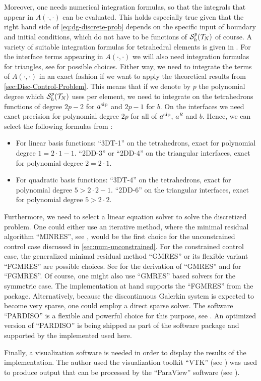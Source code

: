 \documentclass[../thesis.tex]{subfiles}
\begin{document}
Moreover, one needs numerical integration formulas, so that the integrals that appear in $A(\cdot, \cdot)$ can be evaluated. This holds especially true given that the right hand side of \cref{eq:dg-discrete-prob} depends on the specific input of boundary and initial conditions, which do not have to be functions of $\mathcal{S}_h^p(\mathcal{T}_N)$ of course.
A variety of suitable integration formulas for tetrahedral elements is given in \cite[Tabelle 4.15, p.\ 314]{JungLanger}. For the interface terms appearing in $A(\cdot, \cdot)$ we will also need integration formulas for triangles, see \cite[Tabelle 4.14, p.\ 313]{JungLanger} for possible choices.
Either way, we need to integrate the terms of $A(\cdot, \cdot)$ in an exact fashion if we want to apply the theoretical results from \cref{sec:Disc-Control-Problem}. This means that if we denote by $p$ the polynomial degree which $\mathcal{S}_h^p(\mathcal{T}_N)$ uses per element, we need to integrate on the tetrahedrons functions of degree $2p - 2$ for $a^{\mathrm{sip}}$ and $2p - 1$ for $b$. On the interfaces we need exact precision for polynomial degree $2p$ for all of $a^{\mathrm{sip}}$, $a^R$ and $b$.
Hence, we can select the following formulas from \cite{JungLanger}:
\begin{itemize}
\item For linear basis functions: ``3DT-1'' on the tetrahedrons, exact for polynomial degree $1 = 2 \cdot 1 - 1$. ``2DD-3'' or ``2DD-4'' on the triangular interfaces, exact for polynomial degree $2 = 2 \cdot 1$.
\item For quadratic basis functions: ``3DT-4'' on the tetrahedrons, exact for polynomial degree $5 > 2 \cdot 2 - 1$. ``2DD-6'' on the triangular interfaces, exact for polynomial degree $5 > 2 \cdot 2$.
\end{itemize}

Furthermore, we need to select a linear equation solver to solve the discretized problem.
One could either use an iterative method, where the minimal residual algorithm ``MINRES'', see \cite{MINRES}, would be the first choice for the unconstrained control case discussed in \cref{sec:num-unconstrained}.
For the constrained control case, the generalized minimal residual method ``GMRES'' or its flexible variant ``FGMRES'' are possible choices. See \cite{GMRES} for the derivation of ``GMRES'' and \cite{FGMRES} for ``FGMRES''.
Of course, one might also use ``GMRES'' based solvers for the symmetric case.
The implementation at hand supports the ``FGMRES'' from the \cite{MKL} package.
Alternatively, because the discontinuous Galerkin system is expected to become very sparse, one could employ a direct sparse solver.
The software ``PARDISO'' is a flexible and powerful choice for this purpose, see \cite{pardiso1,pardiso2,pardiso3}.
An optimized version of ``PARDISO'' is being shipped as part of the \cite{MKL} software package and supported by the implemented used here.

Finally, a visualization software is needed in order to display the results of the implementation.
The author used the visualization toolkit ``VTK'' (see \cite{VTK}) was used to produce output that can be processed by the ``ParaView'' software (see \cite{ParaView}).
\end{document}
